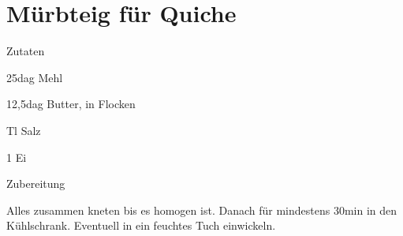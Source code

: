 \chapter*{Mürbteig für Quiche}
\begin{multicols}{2}
 {\Large Zutaten}
 \begin{Zutaten}
		\item 25dag Mehl
		\item 12,5dag Butter, in Flocken
		\item {}Tl Salz
		\item 1 Ei
		
\end{Zutaten}
\columnbreak
{}
\end{multicols}

{\Large Zubereitung} \newline
\begin{addmargin}[1cm]{0cm}
	Alles zusammen kneten bis es homogen ist.\newline
	Danach für mindestens 30min in den Kühlschrank. Eventuell in ein feuchtes Tuch einwickeln.

\end{addmargin}
